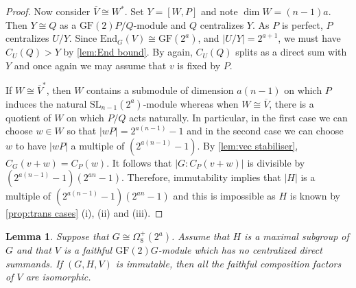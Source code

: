 \documentclass[12pt]{amsart}
\newtheorem{lemma}[theorem]{Lemma}
\theoremstyle{remark}
\theoremstyle{notation}
\theoremstyle{definition}
\newcommand{\GF}{\mathrm{GF}}
\newcommand{\SL}{\mathrm{SL}}
\newcommand{\0}{\emptyset}
\begin{document}
\begin{proof}
Now consider   $\overline V \cong W^*$. Set $Y=[W,P]$ and note $\dim W=(n-1)a$. Then $Y\cong Q$ as a $\GF(2)P/Q$-module and $Q$ centralizes $Y$.  As $P$ is perfect, $P$ centralizes $U/Y$.  Since $\mathrm {End}_G(V)\cong \GF(2^a)$, and $|U/Y|=2^{a+1}$, we must have $C_U(Q)> Y$ by \cref{lem:End bound}.  By  \cite[Tables B and C]{JonesParshall} again,   $C_U(Q)$ splits as a direct sum with $Y$ and once again we may assume that $v$ is fixed by $P$.


If $W \cong \overline V^*$, then $W$ contains a submodule of dimension $a(n-1)$ on which $P$ induces the natural $ \SL_{n-1}(2^a)$-module whereas when $W \cong \overline V$, there is a quotient of $W$ on which  $P/Q$ acts naturally. In particular, in the first case we can choose $w \in W$ so that $|wP|= 2^{a(n-1)}-1$ and in the second case we can choose $w$ to have $|wP|$   a multiple of $ (2^{a(n-1)}-1) $. By \cref{lem:vec stabiliser}, $C_G(v+w)= C_P(w)$. It follows that $|G:C_P(v+w)|$ is divisible by $(2^{a(n-1)}-1)(2^{an}-1)$. Therefore, immutability implies that  $|H|$ is a multiple of $(2^{a(n-1)}-1)(2^{an}-1)$ and this is impossible as $H$ is known by  \cref{prop:trans cases} (i), (ii) and (iii).
\end{proof}

\begin{lemma}\label{lem:O8 all the same}
 Suppose that $G \cong \Omega_{8}^+(2^a)$.  Assume that $H$ is a maximal subgroup of $G$ and that $V$ is a faithful $\GF(2)G$-module which has no centralized direct summands. If $(G,H,V)$ is immutable, then all the faithful composition factors of $V$ are isomorphic.
\end{lemma}
\end{document}

